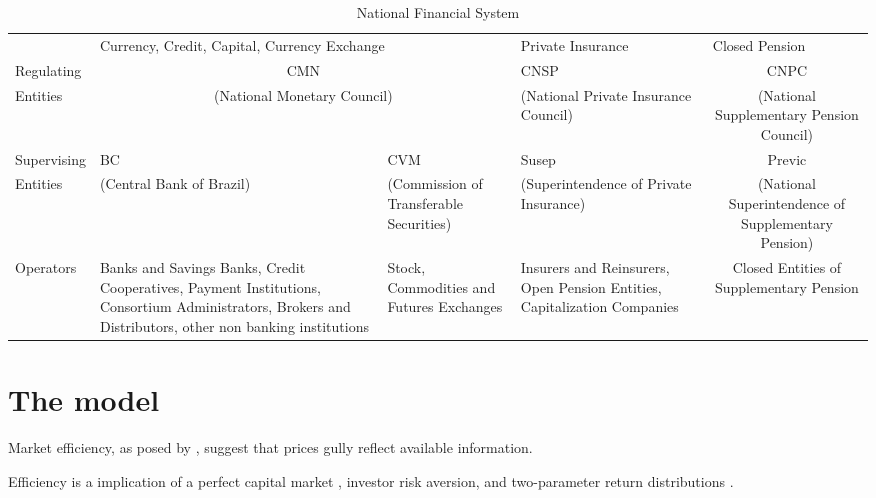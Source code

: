 \documentclass[a4paper]{article}
\begin{document}
\begin{table}[H]
\caption{National Financial System}
\label{tab:sistemanacional}
\centering
\begin{tabular}{lp{2.75cm}|p{2.75cm}|p{2.75cm}|c}
 & \multicolumn{2}{p{5.5cm}||}{Currency, Credit, Capital, Currency Exchange} & \multicolumn{1}{l||}{Private Insurance} & \multicolumn{1}{l}{Closed Pension} \\ \cline{2-5} 
\multicolumn{1}{l|}{Regulating} & \multicolumn{2}{c||}{CMN} & \multicolumn{1}{p{2.75cm}||}{CNSP} & \multicolumn{1}{p{2.75cm}|}{CNPC} \\
\multicolumn{1}{l|}{Entities} & \multicolumn{2}{c||}{(National Monetary Council)} & \multicolumn{1}{p{2.75cm}||}{(National Private Insurance Council)} & \multicolumn{1}{p{2.75cm}|}{(National Supplementary Pension Council)} \\ \hline
\multicolumn{1}{l|}{Supervising} & \multicolumn{1}{p{2.75cm}||}{BC} & \multicolumn{1}{p{2.75cm}||}{CVM} & \multicolumn{1}{p{2.75cm}||}{Susep} & \multicolumn{1}{p{2.75cm}|}{Previc} \\
\multicolumn{1}{l|}{Entities} & \multicolumn{1}{p{2.75cm}||}{(Central Bank of Brazil)} & \multicolumn{1}{p{2.75cm}||}{(Commission of Transferable Securities)} & \multicolumn{1}{p{2.75cm}||}{(Superintendence of Private Insurance)} & \multicolumn{1}{p{2.75cm}|}{(National Superintendence of Supplementary Pension)} \\ \hline
\multicolumn{1}{l|}{Operators} & \multicolumn{1}{p{2.75cm}||}{Banks and Savings Banks,  Credit Cooperatives, Payment Institutions, Consortium Administrators, Brokers and Distributors, other non banking institutions} & \multicolumn{1}{p{2.75cm}||}{Stock, Commodities and Futures Exchanges} & \multicolumn{1}{p{2.75cm}||}{Insurers and Reinsurers, Open Pension Entities, Capitalization Companies} & \multicolumn{1}{p{2.75cm}|}{Closed Entities of Supplementary Pension} \\ \cline{2-5} 
\end{tabular}
\end{table}

\section{The model}

Market efficiency, as posed by \citet{fama1970}, suggest that prices gully reflect available information.
\begin{comment}
providing accurate signals for resource allocation. Prices should reflect information as it reflects the forecasts of future prices, which should be revised with the arrival of new information.
\end{comment}
Efficiency is a implication of a perfect capital market , investor risk aversion, and two-parameter return distributions \citet{famamcbeth1973}.
\end{document}
